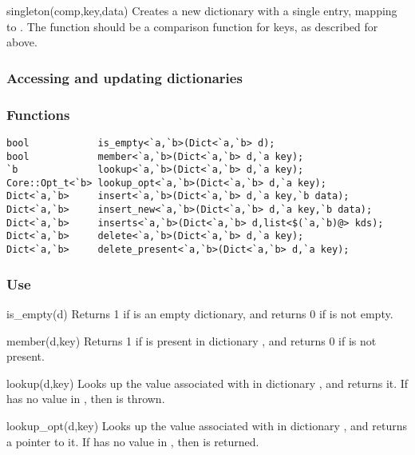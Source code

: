 \begin{defun}{singleton}{(comp,key,data)}
Creates a new dictionary with a single entry, mapping  to
.  The function  should be a comparison function for
keys, as described for  above.
\end{defun}

\subsubsection*{Accessing and updating dictionaries}

\subsubsection*{Functions}
\begin{verbatim}
bool            is_empty<`a,`b>(Dict<`a,`b> d);
bool            member<`a,`b>(Dict<`a,`b> d,`a key);
`b              lookup<`a,`b>(Dict<`a,`b> d,`a key);
Core::Opt_t<`b> lookup_opt<`a,`b>(Dict<`a,`b> d,`a key);
Dict<`a,`b>     insert<`a,`b>(Dict<`a,`b> d,`a key,`b data);
Dict<`a,`b>     insert_new<`a,`b>(Dict<`a,`b> d,`a key,`b data);
Dict<`a,`b>     inserts<`a,`b>(Dict<`a,`b> d,list<$(`a,`b)@> kds);
Dict<`a,`b>     delete<`a,`b>(Dict<`a,`b> d,`a key);
Dict<`a,`b>     delete_present<`a,`b>(Dict<`a,`b> d,`a key);
\end{verbatim}

\subsubsection*{Use}

\begin{defun}{is_empty}{(d)}
Returns 1 if  is an empty dictionary, and returns 0 if  is
not empty.
\end{defun}

\begin{defun}{member}{(d,key)}
Returns 1 if  is present in dictionary , and returns 0
if  is not present.
\end{defun}

\begin{defun}{lookup}{(d,key)}
Looks up the value associated with  in dictionary , and
returns it.  If  has no value in , then  is
thrown.
\end{defun}

\begin{defun}{lookup_opt}{(d,key)}
Looks up the value associated with  in dictionary , and
returns a pointer to it.  If  has no value in , then
 is returned.
\end{defun}

